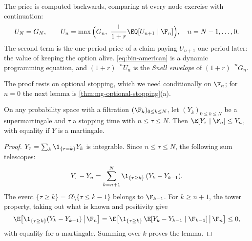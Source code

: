 The price is computed backwards, comparing at every node exercise with continuation:
\begin{equation}\label{eq:bin-american}
  U_N=G_N,\qquad U_n=\max\Big(G_n,\ \frac{1}{1+r}\EQ[U_{n+1}\mid\F_n]\Big),\quad n=N-1,\dots,0 .
\end{equation}
The second term is the one-period price of a claim paying $U_{n+1}$ one period later: the
value of keeping the option alive. \eqref{eq:bin-american} is a dynamic programming
equation, and $(1+r)^{-n}U_n$ is the \emph{Snell envelope} of $(1+r)^{-n}G_n$.

The proof rests on optional stopping, which we need conditionally on $\F_n$; for $n=0$ the
next lemma is \cref{thm:mg-optional-stopping}(a).

\begin{lemma}\label{lem:bin-optional-stopping}
On any probability space with a filtration $(\F_k)_{0\le k\le N}$, let $(Y_k)_{0\le k\le N}$
be a supermartingale and $\tau$ a stopping time with $n\le\tau\le N$. Then
$\E[Y_\tau\mid\F_n]\le Y_n$, with equality if $Y$ is a martingale.
\end{lemma}

\begin{proof}
$Y_\tau=\sum_k\1_{\{\tau=k\}}Y_k$ is integrable. Since $n\le\tau\le N$, the following sum
telescopes:
\[
  Y_\tau-Y_n=\sum_{k=n+1}^{N}\1_{\{\tau\ge k\}}\,(Y_k-Y_{k-1}).
\]
The event $\{\tau\ge k\}=\Omega\setminus\{\tau\le k-1\}$ belongs to $\F_{k-1}$. For
$k\ge n+1$, the tower property, taking out what is known and positivity give
\[
  \E\big[\1_{\{\tau\ge k\}}(Y_k-Y_{k-1})\,\big|\,\F_n\big]
  =\E\big[\1_{\{\tau\ge k\}}\,\E[Y_k-Y_{k-1}\mid\F_{k-1}]\,\big|\,\F_n\big]\le0,
\]
with equality for a martingale. Summing over $k$ proves the lemma.
\end{proof}

